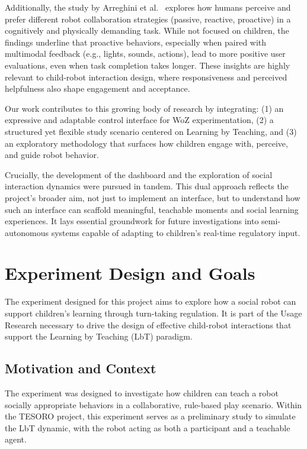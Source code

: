 \documentclass[a4paper]{usiinfbachelorproject}
\begin{document}
Additionally, the study by Arreghini et al.~\cite{arreghini2022exploring} explores how humans perceive and prefer different robot collaboration strategies (passive, reactive, proactive) in a cognitively and physically demanding task.
While not focused on children, the findings underline that proactive behaviors, especially when paired with multimodal feedback (e.g., lights, sounds, actions), lead to more positive user evaluations, even when task completion takes longer.
These insights are highly relevant to child-robot interaction design, where responsiveness and perceived helpfulness also shape engagement and acceptance.

Our work contributes to this growing body of research by integrating:
(1) an expressive and adaptable control interface for WoZ experimentation,
(2) a structured yet flexible study scenario centered on Learning by Teaching, and
(3) an exploratory methodology that surfaces how children engage with, perceive, and guide robot behavior.

Crucially, the development of the dashboard and the exploration of social interaction dynamics were pursued in tandem.
This dual approach reflects the project's broader aim, not just to implement an interface, but to understand how such an interface can scaffold meaningful, teachable moments and social learning experiences.
It lays essential groundwork for future investigations into semi-autonomous systems capable of adapting to children's real-time regulatory input.

\section{\textbf{Experiment Design and Goals}}\label{sec:design}

The experiment designed for this project aims to explore how a social robot can support children's learning through turn-taking regulation.
It is part of the Usage Research necessary to drive the design of effective child-robot interactions that support the Learning by Teaching (LbT) paradigm.

\subsection*{\textbf{Motivation and Context}}
The experiment was designed to investigate how children can teach a robot socially appropriate behaviors in a collaborative, rule-based play scenario.
Within the TESORO project, this experiment serves as a preliminary study to simulate the LbT dynamic, with the robot acting as both a participant and a teachable agent.
\end{document}

